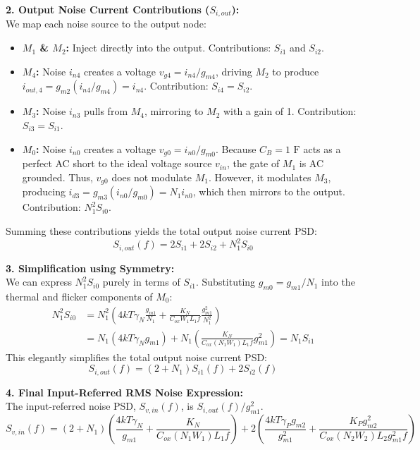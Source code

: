 \documentclass[12pt, a4paper]{article}
\begin{document}
\textbf{2. Output Noise Current Contributions ($S_{i,out}$):}\\
We map each noise source to the output node:
\begin{itemize}
    \item \textbf{$M_1$ \& $M_2$:} Inject directly into the output. Contributions: $S_{i1}$ and $S_{i2}$.
    \item \textbf{$M_4$:} Noise $i_{n4}$ creates a voltage $v_{g4} = i_{n4}/g_{m4}$, driving $M_2$ to produce $i_{out,4} = g_{m2}(i_{n4}/g_{m4}) = i_{n4}$. Contribution: $S_{i4} = S_{i2}$.
    \item \textbf{$M_3$:} Noise $i_{n3}$ pulls from $M_4$, mirroring to $M_2$ with a gain of 1. Contribution: $S_{i3} = S_{i1}$.
    \item \textbf{$M_0$:} Noise $i_{n0}$ creates a voltage $v_{g0} = i_{n0}/g_{m0}$. Because $C_B = 1\text{ F}$ acts as a perfect AC short to the ideal voltage source $v_{in}$, the gate of $M_1$ is AC grounded. Thus, $v_{g0}$ does not modulate $M_1$. However, it modulates $M_3$, producing $i_{d3} = g_{m3}(i_{n0}/g_{m0}) = N_1 i_{n0}$, which then mirrors to the output. Contribution: $N_1^2 S_{i0}$.
\end{itemize}

Summing these contributions yields the total output noise current PSD:
\begin{equation}
    S_{i,out}(f) = 2S_{i1} + 2S_{i2} + N_1^2 S_{i0}
\end{equation}

\textbf{3. Simplification using Symmetry:}\\
We can express $N_1^2 S_{i0}$ purely in terms of $S_{i1}$. Substituting $g_{m0} = g_{m1}/N_1$ into the thermal and flicker components of $M_0$:
\begin{align*}
    N_1^2 S_{i0} &= N_1^2 \left( 4kT\gamma_N \frac{g_{m1}}{N_1} + \frac{K_N}{C_{ox} W_1 L_1 f} \frac{g_{m1}^2}{N_1^2} \right) \\
                 &= N_1 \left( 4kT\gamma_N g_{m1} \right) + N_1 \left( \frac{K_N}{C_{ox} (N_1 W_1) L_1 f} g_{m1}^2 \right) = N_1 S_{i1}
\end{align*}
This elegantly simplifies the total output noise current PSD:
\begin{equation}
    S_{i,out}(f) = (2 + N_1)S_{i1}(f) + 2S_{i2}(f)
\end{equation}

\textbf{4. Final Input-Referred RMS Noise Expression:}\\
The input-referred noise PSD, $S_{v,in}(f)$, is $S_{i,out}(f) / g_{m1}^2$. 
\begin{equation}
    S_{v,in}(f) = (2+N_1) \left( \frac{4kT\gamma_N}{g_{m1}} + \frac{K_N}{C_{ox} (N_1 W_1) L_1 f} \right) + 2 \left( \frac{4kT\gamma_P g_{m2}}{g_{m1}^2} + \frac{K_P g_{m2}^2}{C_{ox} (N_2 W_2) L_2 g_{m1}^2 f} \right)
\end{equation}
\end{document}
